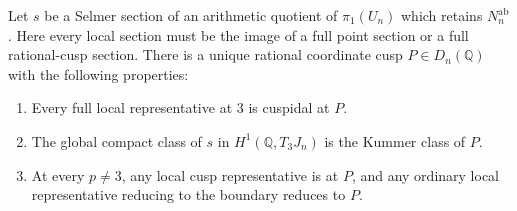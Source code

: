 \begin{lemma}
\label{lem:lm-power-compact}
Let $s$ be a Selmer section of an arithmetic quotient of
$\pi_1(U_n)$ which retains $N_n^{\mathrm{ab}}$.
Here every local section must be the image of a full point
section or a full rational-cusp section.
There is a unique rational coordinate cusp $P\in D_n(\mathbb Q)$
with the following properties:
\begin{enumerate}
\item Every full local representative at $3$ is cuspidal at $P$.
\item The global compact class of $s$ in
$H^1(\mathbb Q,T_3J_n)$ is the Kummer class of $P$.
\item At every $p\ne3$, any local cusp representative is at $P$,
and any ordinary local representative reducing to the boundary
reduces to $P$.
\end{enumerate}
\end{lemma}
